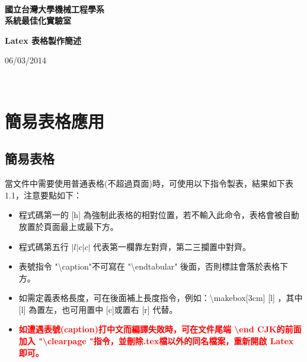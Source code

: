 \documentclass[12pt,a4paper]{report}
\begin{document}
\begin{CJK}{UTF8}{bkai}
\thispagestyle{empty}
\begin{center}
       ~\\
        \vspace{6.8cm}

        \textbf{\Huge
國立台灣大學機械工程學系 \\
系統最佳化實驗室}

        \vspace{3cm}

        \textbf{\Huge
	Latex 表格製作簡述
        }
        \vspace{11.5cm}

        {\large
            06/03/2014
        }
    \end{center}

\newpage

\tableofcontents
\listoftables

\thispagestyle{empty}
~
\newpage

\chapter{簡易表格應用}

\section{簡易表格}
當文件中需要使用普通表格(不超過頁面)時，可使用以下指令製表，結果如下表 1.1，注意要點如下：
\begin{itemize}
    \item 程式碼第一的 [h] 為強制此表格的相對位置，若不輸入此命令，表格會被自動放置於頁面最上或最下方。
    \item 程式碼第五行 $| l | c | c |$ 代表第一欄靠左對齊，第二三攔置中對齊。
    \item 表號指令 "\textbackslash caption"不可寫在 "\textbackslash end\textbraceleft tabular\textbraceright" 後面，否則標註會落於表格下方。
    \item 如需定義表格長度，可在後面補上長度指令，例如：\textbackslash makebox[3cm] [l] ，其中 [l] 為置左，也可用置中 [c]或置右 [r] 代替。
    \item {\bf \textcolor{red}{如遭遇表號(caption)打中文而編譯失敗時，可在文件尾端 \textbackslash end \textbraceleft CJK\textbraceright 的前面加入 "\textbackslash clearpage "指令，並刪除.tex檔以外的同名檔案，重新開啟 Latex 即可。}}


\end{itemize}
\end{CJK}
\end{document}
